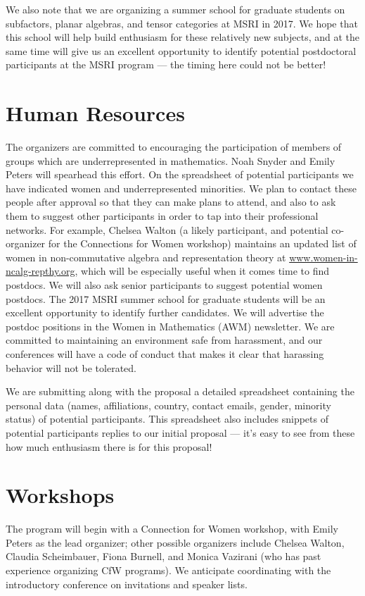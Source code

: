 \documentclass[12pt]{article}
\begin{document}
We also note that we are organizing a summer school for graduate students on subfactors, planar algebras, and tensor categories at MSRI in 2017. We hope that this school will help build enthusiasm for these relatively new subjects, and at the same time will give us an excellent opportunity to identify potential postdoctoral participants at the MSRI program --- the timing here could not be better!

\section{Human Resources}
The organizers are committed to encouraging the participation of members of groups which are underrepresented in mathematics. Noah Snyder and Emily Peters will spearhead this effort. On the spreadsheet of potential participants we have indicated women and underrepresented minorities. We plan to contact these people after approval so that they can make plans to attend, and also to ask them to suggest other participants in order to tap into their professional networks. For example, Chelsea Walton (a likely participant, and potential co-organizer for the Connections for Women workshop) maintains an updated list of women in non-commutative algebra and representation theory at \url{www.women-in-ncalg-repthy.org}, which will be especially useful when it comes time to find postdocs. We will also ask senior participants to suggest potential women postdocs. The 2017 MSRI summer school for graduate students will be an excellent opportunity to identify further candidates. We will advertise the postdoc positions in the Women in Mathematics (AWM) newsletter.  We are committed to maintaining an environment safe from harassment, and our conferences will have a code of conduct that makes it clear that harassing behavior will not be tolerated.

We are submitting along with the proposal a detailed spreadsheet containing the personal data (names, affiliations, country, contact emails, gender, minority status) of potential participants. This spreadsheet also includes snippets of potential participants replies to our initial proposal --- it's easy to see from these how much enthusiasm there is for this proposal!


\section{Workshops}
The program will begin with a Connection for Women workshop, with Emily Peters as the lead organizer; other possible organizers include Chelsea Walton, Claudia Scheimbauer, Fiona Burnell, and Monica Vazirani (who has past experience organizing CfW programs). We anticipate coordinating with the introductory conference on invitations and speaker lists. 
\end{document}
